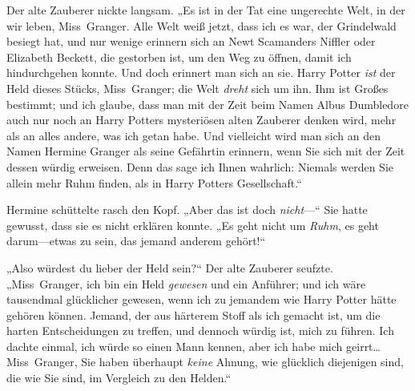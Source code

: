 Der alte Zauberer nickte langsam. „Es ist in der Tat eine ungerechte Welt, in der wir leben, Miss~Granger. Alle Welt weiß jetzt, dass ich es war, der Grindelwald besiegt hat, und nur wenige erinnern sich an Newt Scamanders Niffler oder Elizabeth Beckett, die gestorben ist, um den Weg zu öffnen, damit ich hindurchgehen konnte. Und doch erinnert man sich an sie. Harry Potter \emph{ist} der Held dieses Stücks, Miss~Granger; die Welt \emph{dreht} sich um ihn. Ihm ist Großes bestimmt; und ich glaube, dass man mit der Zeit beim Namen Albus Dumbledore auch nur noch an Harry Potters mysteriösen alten Zauberer denken wird, mehr als an alles andere, was ich getan habe. Und vielleicht wird man sich an den Namen Hermine Granger als seine Gefährtin erinnern, wenn Sie sich mit der Zeit dessen würdig erweisen. Denn das sage ich Ihnen wahrlich: Niemals werden Sie allein mehr Ruhm finden, als in Harry Potters Gesellschaft.“

Hermine schüttelte rasch den Kopf. „Aber das ist doch \emph{nicht}—“ Sie hatte gewusst, dass sie es nicht erklären konnte. „Es geht nicht um \emph{Ruhm}, es geht darum—etwas zu sein, das jemand anderem gehört!“

„Also würdest du lieber der Held sein?“ Der alte Zauberer seufzte. „Miss~Granger, ich bin ein Held \emph{gewesen} und ein Anführer; und ich wäre tausendmal glücklicher gewesen, wenn ich zu jemandem wie Harry Potter hätte gehören können. Jemand, der aus härterem Stoff als ich gemacht ist, um die harten Entscheidungen zu treffen, und dennoch würdig ist, mich zu führen. Ich dachte einmal, ich würde so einen Mann kennen, aber ich habe mich geirrt…Miss~Granger, Sie haben überhaupt \emph{keine} Ahnung, wie glücklich diejenigen sind, die wie Sie sind, im Vergleich zu den Helden.“

